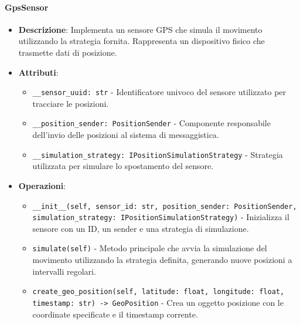 \documentclass[10pt]{article}
\begin{document}
    \paragraph{GpsSensor}
    \begin{itemize}
        \item \textbf{Descrizione}: Implementa un sensore GPS che simula il movimento utilizzando la strategia fornita. Rappresenta un dispositivo fisico che trasmette dati di posizione.
        \item \textbf{Attributi}:
        \begin{itemize}
            \item \texttt{\_\_sensor\_uuid: str} - Identificatore univoco del sensore utilizzato per tracciare le posizioni.
            \item \texttt{\_\_position\_sender: PositionSender} - Componente responsabile dell'invio delle posizioni al sistema di messaggistica.
            \item \texttt{\_\_simulation\_strategy: IPositionSimulationStrategy} - Strategia utilizzata per simulare lo spostamento del sensore.
        \end{itemize}
        \item \textbf{Operazioni}:
        \begin{itemize}
            \item \texttt{\_\_init\_\_(self, sensor\_id: str, position\_sender: PositionSender, simulation\_strategy: IPositionSimulationStrategy)} - Inizializza il sensore con un ID, un sender e una strategia di simulazione.
            \item \texttt{simulate(self)} - Metodo principale che avvia la simulazione del movimento utilizzando la strategia definita, generando nuove posizioni a intervalli regolari.
            \item \texttt{create\_geo\_position(self, latitude: float, longitude: float, timestamp: str) -> GeoPosition} - Crea un oggetto posizione con le coordinate specificate e il timestamp corrente.
        \end{itemize}
    \end{itemize}
\end{document}
